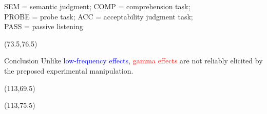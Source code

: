 \documentclass[final]{beamer}
\begin{document}
\begin{frame}{}
\begin{textblock}{67}
SEM = semantic judgment; COMP = comprehension task; 
\\ PROBE = probe task; ACC = acceptability judgment task; 
\\ PASS = passive listening 
\end{textblock}

%
%

\begin{textblock}{42}(73.5,76.5)
\begin{block}{Conclusion}
Unlike \textcolor{blue}{low-frequency effects}, \textcolor{red}{gamma effects} are not reliably elicited by the preposed experimental manipulation.
\end{block}
\end{textblock}

\begin{textblock}{10}(113,69.5)
\end{textblock}
\begin{textblock}{10}(113,75.5)
\end{textblock}

\end{frame}
\end{document}
